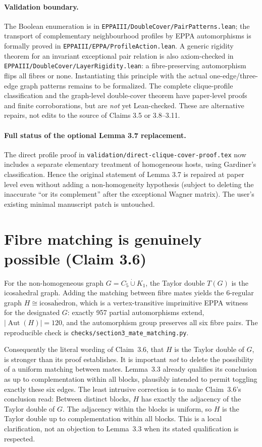 \documentclass[11pt,a4paper]{article}
\begin{document}
\paragraph{Validation boundary.}
The Boolean enumeration is in
\texttt{EPPAIII/DoubleCover/PairPatterns.lean};
the transport of complementary neighbourhood
profiles by EPPA automorphisms is formally
proved in \texttt{EPPAIII/EPPA/ProfileAction.lean}.
A generic rigidity theorem for an invariant
exceptional pair relation is also axiom-checked in
\texttt{EPPAIII/DoubleCover/LayerRigidity.lean}:
a fibre-preserving automorphism flips all
fibres or none. Instantiating this principle
with the actual one-edge/three-edge graph
patterns remains to be formalized.
The complete clique-profile classification
and the graph-level double-cover theorem have
paper-level proofs and finite corroborations,
but are \emph{not} yet Lean-checked.
These are alternative repairs, not edits to
the source of Claims 3.5 or 3.8--3.11.

\paragraph{Full status of the optional Lemma 3.7 replacement.}
The direct profile proof in \texttt{validation/direct-clique-cover-proof.tex}
now includes a separate elementary treatment of homogeneous hosts,
using Gardiner's classification. Hence the original statement of
Lemma 3.7 is repaired at paper level even without adding a
non-homogeneity hypothesis (subject to deleting the inaccurate
``or its complement'' after the exceptional Wagner matrix).
The user's existing minimal manuscript patch is untouched.

\section*{Fibre matching is genuinely possible (Claim 3.6)}
For the non-homogeneous graph \(G=C_5\dot\cup K_1\), the
Taylor double \(T(G)\) is the icosahedral graph.
Adding the matching between fibre mates yields the
6-regular graph \(H\cong\overline{\text{icosahedron}}\),
which is a vertex-transitive imprimitive EPPA witness
for the designated \(G\): exactly 957 partial automorphisms
extend, \(|\operatorname{Aut}(H)|=120\), and the
automorphism group preserves all six fibre pairs.
The reproducible check is
\texttt{checks/section3\_mate\_matching.py}.

Consequently the literal wording of Claim~3.6,
that \(H\) is the Taylor double of \(G\), is
stronger than its proof establishes. It is important
\emph{not} to delete the possibility of a uniform
matching between mates. Lemma~3.3 already qualifies
its conclusion as up to complementation within all
blocks, plausibly intended to permit toggling exactly
these six edges. The least intrusive correction is to
make Claim~3.6's conclusion read:
Between distinct blocks, \(H\) has exactly the
adjacency of the Taylor double of \(G\). The adjacency
within the blocks is uniform, so \(H\) is the Taylor
double up to complementation within all blocks.
This is a local clarification, not an objection
to Lemma~3.3 when its stated qualification is respected.
\end{document}
